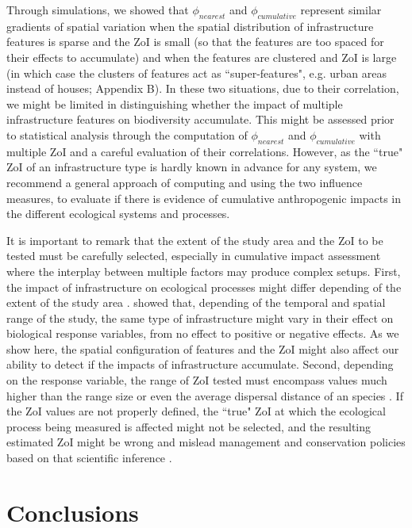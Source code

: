 \documentclass[titlepage]{article}
\begin{document}
Through simulations, we showed that $\phi_{nearest}$ and $\phi_{cumulative}$ represent similar gradients of spatial variation when the spatial distribution of infrastructure features is sparse and the ZoI is small (so that the features are too spaced for their effects to accumulate) and when the features are clustered and ZoI is large (in which case the clusters of features act as ``super-features", e.g. urban areas instead of houses; Appendix B). In these two situations, due to their correlation, we might be limited in distinguishing whether the impact of multiple infrastructure features on biodiversity accumulate. This might be assessed prior to statistical analysis through the computation of $\phi_{nearest}$ and $\phi_{cumulative}$ with multiple ZoI and a careful evaluation of their correlations. However, as the ``true" ZoI of an infrastructure type is hardly known in advance for any system, we recommend a general approach of computing and using the two influence measures, to evaluate if there is evidence of cumulative anthropogenic impacts in the different ecological systems and processes.

It is important to remark that the extent of the study area and the ZoI to be tested must be carefully selected, especially in cumulative impact assessment where the interplay between multiple factors may produce complex setups. First, the impact of infrastructure on ecological processes might differ depending of the extent of the study area \citep{vistnes_matter_2008}. \citet{skarin_human_2014} showed that, depending of the temporal and spatial range of the study, the same type of infrastructure might vary in their effect on biological response variables, from no effect to positive or negative effects. As we show here, the spatial configuration of features and the ZoI might also affect our ability to detect if the impacts of infrastructure accumulate. 
Second, depending on the response variable, the range of ZoI tested must encompass values much higher than the range size or even the average dispersal distance of an species \citep{jackson_what_2012}. If the ZoI values are not properly defined, the ``true" ZoI at which the ecological process being measured is affected might not be selected, and the resulting estimated ZoI might be wrong and mislead management and conservation policies based on that scientific inference \citep[e.g.][]{jackson_are_2015}.

\section{Conclusions}
\end{document}
